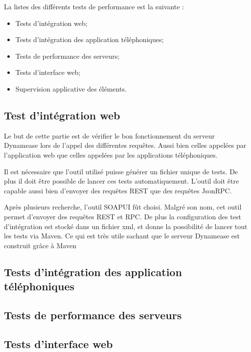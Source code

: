 La listes des différents tests de performance est la suivante :

\begin{itemize}
	\item Tests d'intégration web;
	\item Tests d'intégration des application téléphoniques;
	\item Tests de performance des serveurs;
	\item Tests d'interface web;
	\item Supervision applicative des éléments.
\end{itemize}

\subsection{Test d'intégration web}

Le but de cette partie est de vérifier le bon fonctionnement du serveur Dynamease lors de l'appel des différentes requêtes. Aussi bien celles appelées par l'application web que celles appelées par les applications téléphoniques.

Il est nécessaire que l'outil utilisé puisse générer un fichier unique de tests. De plus il doit être possible de lancer ces tests automatiquement. L'outil doit être capable aussi bien d'envoyer des requêtes REST que des requêtes JsonRPC.

Après plusieurs recherche, l'outil SOAPUI fût choisi. Malgré son nom, cet outil permet d'envoyer des requêtes REST et RPC. De plus la configuration des test d'intégration est stocké dans un fichier xml, et donne la possibilité de lancer tout les tests via Maven. Ce qui est très utile sachant que le serveur Dynamease est construit grâce à Maven

\subsection{Tests d'intégration des application téléphoniques}


\subsection{Tests de performance des serveurs}

\subsection{Tests d'interface web}

